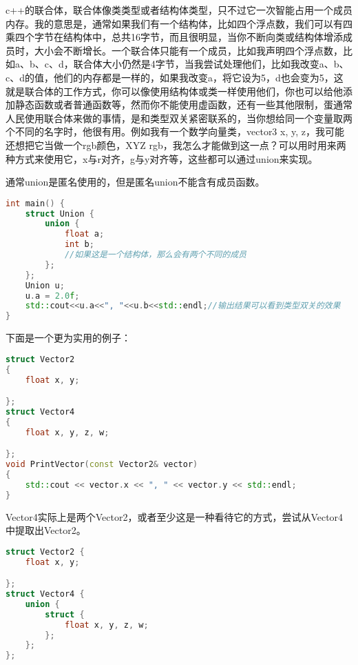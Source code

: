 c++的联合体，联合体像类类型或者结构体类型，只不过它一次智能占用一个成员内存。我的意思是，通常如果我们有一个结构体，比如四个浮点数，我们可以有四乘四个字节在结构体中，总共16字节，而且很明显，当你不断向类或结构体增添成员时，大小会不断增长。一个联合体只能有一个成员，比如我声明四个浮点数，比如{\ncodestyle a}、{\ncodestyle b}、{\ncodestyle c}、{\ncodestyle d}，联合体大小仍然是4字节，当我尝试处理他们，比如我改变{\ncodestyle a}、{\ncodestyle b}、{\ncodestyle c}、{\ncodestyle d}的值，他们的内存都是一样的，如果我改变a，将它设为5，d也会变为5，这就是联合体的工作方式，你可以像使用结构体或类一样使用他们，你也可以给他添加静态函数或者普通函数等，然而你不能使用虚函数，还有一些其他限制，蛋通常人民使用联合体来做的事情，是和类型双关紧密联系的，当你想给同一个变量取两个不同的名字时，他很有用。例如我有一个数学向量类，{\ncodestyle vector3 {x, y, z}}，我可能还想把它当做一个rgb颜色，{\ncodestyle XYZ rgb}，我怎么才能做到这一点？可以用时用来两种方式来使用它，{\ncodestyle x}与{\ncodestyle r}对齐，{\ncodestyle g}与{\ncodestyle y}对齐等，这些都可以通过{\ncodestyle union}来实现。

通常{\ncodestyle union}是匿名使用的，但是匿名{\ncodestyle union}不能含有成员函数。

\begin{lstlisting}[language=c++]
int main() {
    struct Union {
        union {
            float a;
            int b;
            //如果这是一个结构体，那么会有两个不同的成员
        };
    };
    Union u;
    u.a = 2.0f;
    std::cout<<u.a<<", "<<u.b<<std::endl;//输出结果可以看到类型双关的效果
}
\end{lstlisting}

下面是一个更为实用的例子：

\begin{lstlisting}[language=c++]
struct Vector2
{
    float x, y;

};
struct Vector4
{
    float x, y, z, w;

};
void PrintVector(const Vector2& vector)
{
    std::cout << vector.x << ", " << vector.y << std::endl;
}
\end{lstlisting}

Vector4实际上是两个Vector2，或者至少这是一种看待它的方式，尝试从Vector4中提取出Vector2。

\begin{lstlisting}[language=c++]
struct Vector2 {
    float x, y;

};
struct Vector4 {
    union {
        struct {
            float x, y, z, w;
        };
    };
};
\end{lstlisting}

